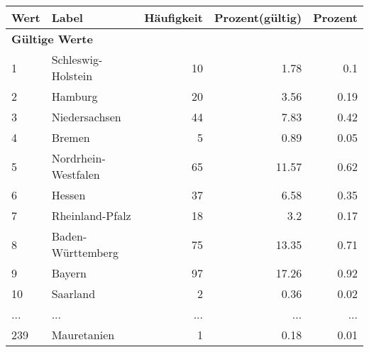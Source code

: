      \begin{longtable}{lXrrr}
     \toprule
     \textbf{Wert} & \textbf{Label} & \textbf{Häufigkeit} & \textbf{Prozent(gültig)} & \textbf{Prozent} \\
     \endhead
     \midrule
     \multicolumn{5}{l}{\textbf{Gültige Werte}}\\
        1 & \multicolumn{1}{X}{Schleswig-Holstein} & %
          \num{10} &
          \num[round-mode=places,round-precision=2]{1,78} &
          \num[round-mode=places,round-precision=2]{0,1} \\
        2 & \multicolumn{1}{X}{Hamburg} & %
          \num{20} &
          \num[round-mode=places,round-precision=2]{3,56} &
          \num[round-mode=places,round-precision=2]{0,19} \\
        3 & \multicolumn{1}{X}{Niedersachsen} & %
          \num{44} &
          \num[round-mode=places,round-precision=2]{7,83} &
          \num[round-mode=places,round-precision=2]{0,42} \\
        4 & \multicolumn{1}{X}{Bremen} & %
          \num{5} &
          \num[round-mode=places,round-precision=2]{0,89} &
          \num[round-mode=places,round-precision=2]{0,05} \\
        5 & \multicolumn{1}{X}{Nordrhein-Westfalen} & %
          \num{65} &
          \num[round-mode=places,round-precision=2]{11,57} &
          \num[round-mode=places,round-precision=2]{0,62} \\
        6 & \multicolumn{1}{X}{Hessen} & %
          \num{37} &
          \num[round-mode=places,round-precision=2]{6,58} &
          \num[round-mode=places,round-precision=2]{0,35} \\
        7 & \multicolumn{1}{X}{Rheinland-Pfalz} & %
          \num{18} &
          \num[round-mode=places,round-precision=2]{3,2} &
          \num[round-mode=places,round-precision=2]{0,17} \\
        8 & \multicolumn{1}{X}{Baden-Württemberg} & %
          \num{75} &
          \num[round-mode=places,round-precision=2]{13,35} &
          \num[round-mode=places,round-precision=2]{0,71} \\
        9 & \multicolumn{1}{X}{Bayern} & %
          \num{97} &
          \num[round-mode=places,round-precision=2]{17,26} &
          \num[round-mode=places,round-precision=2]{0,92} \\
        10 & \multicolumn{1}{X}{Saarland} & %
          \num{2} &
          \num[round-mode=places,round-precision=2]{0,36} &
          \num[round-mode=places,round-precision=2]{0,02} \\
       ... & ... & ... & ... & ... \\
        239 & \multicolumn{1}{X}{Mauretanien} & %
          \num{1} &
          \num[round-mode=places,round-precision=2]{0,18} &
          \num[round-mode=places,round-precision=2]{0,01} \\


\end{longtable}
